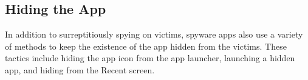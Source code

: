 \documentclass[sigconf,balance=false]{acmart}
\newcommand{\alex}[1]{\textcolor{chicagomaroon}{\noindent[AL: #1]}}
\newcommand{\damon}[1]{\textcolor{blue}{\noindent[DM: #1]}}
\newcommand{\grant}[1]{\textsf{\textcolor{teal}{[GH: #1]}}}
\newcommand{\geoff}[1]{\textcolor{purple}{\noindent[GV: #1]}}
\newcommand{\alex}[1]{}
\newcommand{\grant}[1]{}
\newcommand{\geoff}[1]{}
\newcommand{\damon}[1]{}
\begin{document}




\subsection{Hiding the App}
\label{subsec:hiding_the_app}
In addition to surreptitiously spying on victims, spyware apps also use a
variety of methods to keep the existence of the app hidden from the victims.
These tactics include hiding the app icon from the app launcher, launching a
hidden app, and hiding from the Recent screen.
\end{document}
